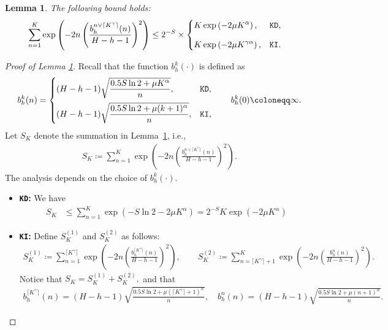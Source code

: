 \documentclass[11pt]{article}
\newcommand{\KD} {\texttt{KD}}
\newcommand{\KI} {\texttt{KI}}
\newtheorem{lemma}{Lemma}
\begin{document}
\begin{lemma}\label{lem:sumUpperBound-UCBVI}
The following bound holds:
\begin{align*}
    \sum_{n=1}^K 
        &\exp\left(-  2n  \left(\frac{b_h^{n \vee \lceil K^\gamma\rceil}(n)}{H-h-1} \right)^2\right) \leq 2^{-S}\times
    \begin{cases}
        \displaystyle K \exp\left(-2\mu { K^{\alpha}}\right),
        & \text{\KD}, \\[2ex]
        \displaystyle K \exp\left(-2\mu  K^{\gamma\alpha}\right),
        & \text{\KI}.
    \end{cases}
\end{align*}
\end{lemma}
\begin{proof}[Proof of Lemma \ref{lem:sumUpperBound-UCBVI}]
Recall that the function $b^k_h(\cdot)$ is defined as
\[
b^k_h(n)
=
\begin{cases}
(H-h-1)\sqrt{\dfrac{0.5 S\ln 2+\mu K^\alpha}{n}}, & \text{\KD},\\[2ex]
(H-h-1)\sqrt{\dfrac{0.5 S\ln 2+\mu (k+1)^\alpha}{n}}, & \text{\KI},
\end{cases}
\qquad
b^k_h(0)\coloneqq\infty.
\]
Let $S_K$ denote the summation in Lemma~\ref{lem:sumUpperBound-UCBVI}, i.e.,
\begin{align*}
    S_K \coloneqq \sum_{n=1}^{K} \exp\left(-  2n  \left(\frac{b_h^{n \vee \lceil K^\gamma\rceil}(n)}{H-h-1} \right)^2\right).
\end{align*}
The analysis depends on the choice of $b^k_h(\cdot)$.

\begin{itemize}[leftmargin=0pt]
    \item {\bf \KD:} We have
        \begin{align*}
        S_K &\leq \sum_{n=1}^{K} \exp\left(-S\ln2-2\mu  K^{\alpha}\right) = 2^{-S} K \exp\left({- 2\mu K^{\alpha}}\right) 
        \end{align*}
    \item {\bf \KI:} Define $S^{(1)}_K$ and $S^{(2)}_K$ as follows:
    \begin{align*}
        S^{(1)}_K \coloneqq \sum_{n=1}^{\lceil K^\gamma\rceil} \exp\left(- 2n  \left(\frac{b_h^{\lceil K^\gamma\rceil}(n)}{H-h-1} \right)^2\right),
        \qquad
        S^{(2)}_K \coloneqq \sum_{n=\lceil K^\gamma\rceil + 1}^{K} \exp\left(- 2n \left(\frac{b_h^{n}(n)}{H-h-1} \right)^2\right).
    \end{align*}
    Notice that $S_K = S^{(1)}_K + S^{(2)}_K,$ and that
        \begin{align*}
            b_h^{\lceil K^\gamma\rceil}(n) = (H-h-1)\sqrt{\frac{0.5 S\ln2 + \mu(\lceil K^\gamma\rceil+1)^{\alpha}}{n}},
            \quad
            b_h^n(n) = (H-h-1)\sqrt{\frac{0.5 S\ln2 + \mu( n+1 )^{\alpha}}{n}}.
        \end{align*}
        

\end{itemize}
\end{proof}
\end{document}
